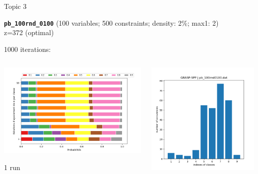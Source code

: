 \documentclass[10pt,xcolor=dvipsnames]{beamer}
\begin{document}
\begin{frame}{Topic 3}

\textbf{\texttt{pb\_100rnd\_0100}} (100 variables; 500 constraints; density: 2\%; max1: 2)\\
z=372 (optimal)
\vspace{1mm}

1000 iterations:
\vspace{1mm}

\begin{columns}
\begin{column}{0.575\textwidth}
\centering
\includegraphics[scale=0.35]{proba100_100.png}

1 run
\end{column}
\begin{column}{0.45\textwidth}
\centering
 \includegraphics[scale=0.3]{all100_100.png}
 

\end{column}
\end{columns}
\end{frame}
\end{document}
